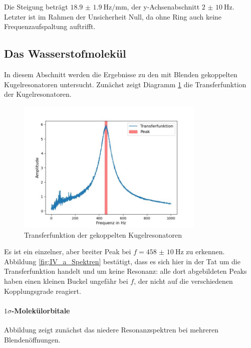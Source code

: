 \documentclass[../main.tex]{subfiles}
\begin{document}
        Die Steigung beträgt $\SI{18.9(19)}{\hertz\per\milli\metre}$, der y-Achsenabschnitt $\SI{2(10)}{\hertz}$. Letzter ist im Rahmen der Unsicherheit Null, da ohne Ring auch keine Frequenzaufspaltung auftrifft.

\subsection{Das Wasserstofmolekül}
    In diesem Abschnitt werden die Ergebnisse zu den mit Blenden gekoppelten Kugelresonatoren untersucht. Zunächst zeigt Diagramm \ref{fig:IV_Transferfunktion} die Transferfunktion der Kugelresonatoren.

    \begin{figure}[H]
        \centering
        \includegraphics[width=0.8\textwidth]{Bilddateien/Auswertung/IV_Transferfunktion.jpg}
        \caption{Transferfunktion der gekoppelten Kugelresonatoren}
        \label{fig:IV_Transferfunktion}
    \end{figure}

    Es ist ein einzelner, aber breiter Peak bei $f=\SI{458(10)}{\hertz}$ zu erkennen. Abbildung \ref{fig:IV_a_Spektren} bestätigt, dass es sich hier in der Tat um die Transferfunktion handelt und um keine Resonanz: alle dort abgebildeten Peaks haben einen kleinen Buckel ungefähr bei $f$, der nicht auf die verschiedenen Kopplungsgrade reagiert.
    
    
    \paragraph{$1\sigma$-Molekülorbitale}
        Abbildung zeigt zunächst das niedere Resonanzspektren bei mehreren Blendenöffnungen.
\end{document}
